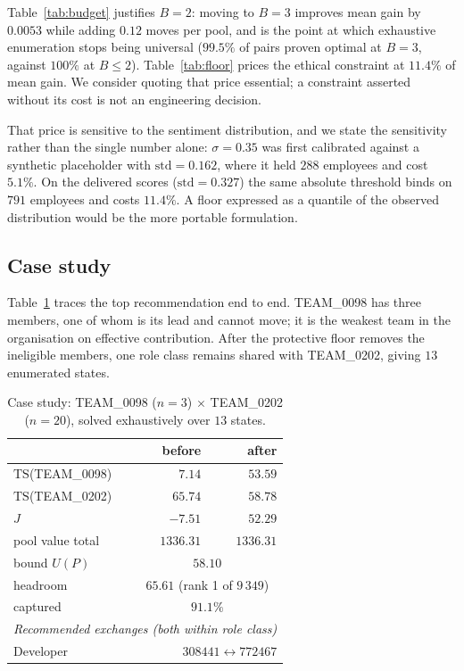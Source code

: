 \documentclass[conference]{IEEEtran}
\begin{document}
Table~\ref{tab:budget} justifies $B=2$: moving to $B=3$ improves mean gain by
$0.0053$ while adding $0.12$ moves per pool, and is the point at which exhaustive
enumeration stops being universal ($99.5\%$ of pairs proven optimal at $B=3$,
against $100\%$ at $B\leq2$). Table~\ref{tab:floor} prices the ethical constraint at
$11.4\%$ of mean gain. We consider quoting that price essential; a constraint
asserted without its cost is not an engineering decision.

That price is sensitive to the sentiment distribution, and we state the sensitivity
rather than the single number alone: $\sigma=0.35$ was first calibrated against a
synthetic placeholder with $\mathrm{std}=0.162$, where it held $288$ employees and
cost $5.1\%$. On the delivered scores ($\mathrm{std}=0.327$) the same absolute
threshold binds on $791$ employees and costs $11.4\%$. A floor expressed as a
quantile of the observed distribution would be the more portable formulation.

\subsection{Case study}
Table~\ref{tab:case} traces the top recommendation end to end. TEAM\_0098 has
three members, one of whom is its lead and cannot move; it is the weakest team in
the organisation on effective contribution. After the protective floor removes the
ineligible members, one role class remains shared with TEAM\_0202, giving $13$
enumerated states.

\begin{table}[t]
\caption{Case study: TEAM\_0098 ($n{=}3$) $\times$ TEAM\_0202 ($n{=}20$),
solved exhaustively over $13$ states.}
\label{tab:case}
\centering\small
\begin{tabular}{lrr}
\toprule
& before & after\\
\midrule
$\mathrm{TS}$(TEAM\_0098) & $7.14$ & $\mathbf{53.59}$\\
$\mathrm{TS}$(TEAM\_0202) & $65.74$ & $58.78$\\
$J$ & $-7.51$ & $\mathbf{52.29}$\\
pool value total & $1336.31$ & $1336.31$\\
\midrule
bound $U(P)$ & \multicolumn{2}{c}{$58.10$}\\
headroom & \multicolumn{2}{c}{$65.61$ (rank 1 of $9\,349$)}\\
captured & \multicolumn{2}{c}{$91.1\%$}\\
\midrule
\multicolumn{3}{l}{\emph{Recommended exchanges (both within role class)}}\\
\quad Developer & \multicolumn{2}{r}{$308441 \leftrightarrow 772467$}\\
\bottomrule
\end{tabular}
\end{table}
\end{document}

